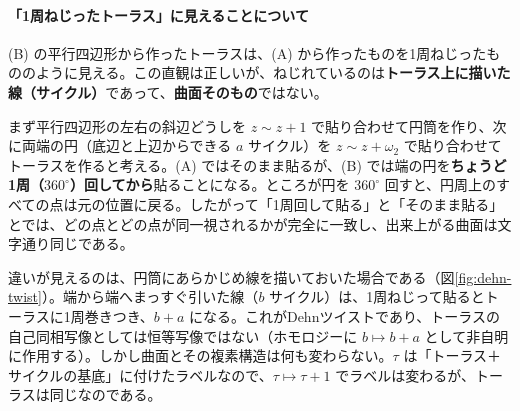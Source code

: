 \documentclass[uplatex, dvipdfmx, book]{jsbook}
\begin{document}
\paragraph{「1周ねじったトーラス」に見えることについて}
(B) の平行四辺形から作ったトーラスは、(A) から作ったものを1周ねじったもののように見える。この直観は正しいが、ねじれているのは\textbf{トーラス上に描いた線（サイクル）}であって、\textbf{曲面そのもの}ではない。

まず平行四辺形の左右の斜辺どうしを $z \sim z+1$ で貼り合わせて円筒を作り、次に両端の円（底辺と上辺からできる $a$ サイクル）を $z \sim z + \omega_2$ で貼り合わせてトーラスを作ると考える。(A) ではそのまま貼るが、(B) では端の円を\textbf{ちょうど1周（$360^\circ$）回してから}貼ることになる。ところが円を $360^\circ$ 回すと、円周上のすべての点は元の位置に戻る。したがって「1周回して貼る」と「そのまま貼る」とでは、どの点とどの点が同一視されるかが完全に一致し、出来上がる曲面は文字通り同じである。

違いが見えるのは、円筒にあらかじめ線を描いておいた場合である（図\ref{fig:dehn-twist}）。端から端へまっすぐ引いた線（$b$ サイクル）は、1周ねじって貼るとトーラスに1周巻きつき、$b + a$ になる。これがDehnツイストであり、トーラスの自己同相写像としては恒等写像ではない（ホモロジーに $b \mapsto b + a$ として非自明に作用する）。しかし曲面とその複素構造は何も変わらない。$\tau$ は「トーラス＋サイクルの基底」に付けたラベルなので、$\tau \mapsto \tau + 1$ でラベルは変わるが、トーラスは同じなのである。
\end{document}
